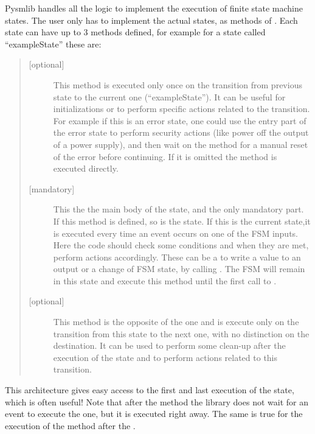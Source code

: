 \documentclass[letterpaper,10pt,english]{sphinxmanual}
\begin{document}
Pysmlib handles all the logic to implement the execution of finite state machine
states. The user only has to implement the actual states, as methods of
{\hyperref[\detokenize{fsm:fsmBase}]{}}. Each state can have up to 3 methods defined, for example for a
state called “exampleState” these are:
\begin{quote}
\begin{description}
\item[{ {[}optional{]}}] \leavevmode
This method is executed only once on the transition from previous state
to the current one (“exampleState”). It can be useful for
initializations or to perform specific actions related to the
transition. For example if this is an error state, one could use the
entry part of the error state to perform security actions (like power
off the output of a power supply), and then wait on the 
method for a manual reset of the error before continuing. If it is
omitted the  method is executed directly.

\item[{ {[}mandatory{]}}] \leavevmode
This the the main body of the state, and the only mandatory part. If
this method is defined, so is the state. If this is the current state,it
is executed every time an event occurs on one of the FSM inputs. Here
the code should check some conditions and when they are met, perform
actions accordingly. These can be a  to write a value to an
output or a change of FSM state, by calling . The FSM  will remain in this state and execute this method until the first call to .

\item[{ {[}optional{]}}] \leavevmode
This method is the opposite of the  one and is execute only
on the transition from this state to the next one, with no distinction
on the destination. It can be used to perform some clean-up after the
execution of the state and to perform actions related to this
transition.

\end{description}
\end{quote}

This architecture gives easy access to the first and last execution of the
state, which is often useful! Note that after the  method the library
does not wait for an event to execute the  one, but it is executed right
away. The same is true for the execution of the  method after the
.
\end{document}

